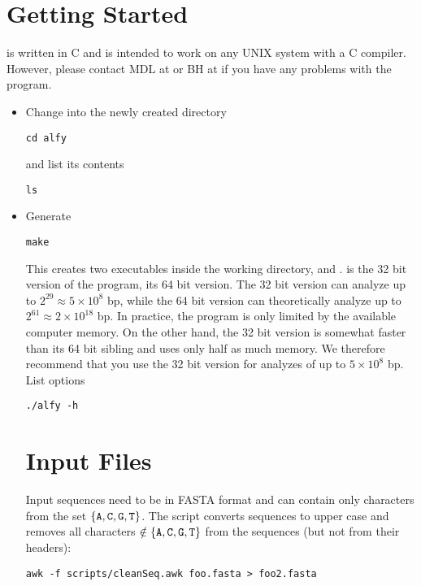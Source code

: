 \documentclass[a4paper]{article}
\begin{document}
\section{Getting Started}
 is written in C and is intended to work on any UNIX system
with a C compiler. However, please contact MDL at
 or BH at 
if you have any problems with the program.
\begin{itemize}
  \I Download 
\begin{verbatim}
git clone https://github.com/evolbioinf/alfy
\end{verbatim}
\item Change into the newly created directory
\begin{verbatim}
cd alfy  
\end{verbatim}
and list its contents
\begin{verbatim}
ls
\end{verbatim}
\item Generate 
\begin{verbatim}
make
\end{verbatim}
This creates two executables inside the working directory, 
and .  is the 32 bit version of the program,
 its 64 bit version. The 32 bit version can analyze up to
$2^{29}\approx 5\times 10^8$ bp, while the 64 bit version can
theoretically analyze up to $2^{61}\approx 2\times 10^{18}$ bp. In
practice, the program is only limited by the available computer
memory. On the other hand, the 32 bit version is somewhat faster than
its 64 bit sibling and uses only half as much memory. We therefore
recommend that you use the 32 bit version for analyzes of up to
$5\times 10^8$ bp.  \I List options
\begin{verbatim}
./alfy -h
\end{verbatim}
\ei

\section{Input Files}
Input sequences need to be in FASTA format and can contain only characters
from the set $\{\texttt{A}, \texttt{C}, \texttt{G}, \texttt{T}\}$. The script
 converts sequences to upper case and
removes all characters $\notin \{\texttt{A}, \texttt{C}, \texttt{G}, \texttt{T}\}$
from the sequences (but not from their headers):
\begin{verbatim}
awk -f scripts/cleanSeq.awk foo.fasta > foo2.fasta
\end{verbatim}


\end{itemize}
\end{document}

